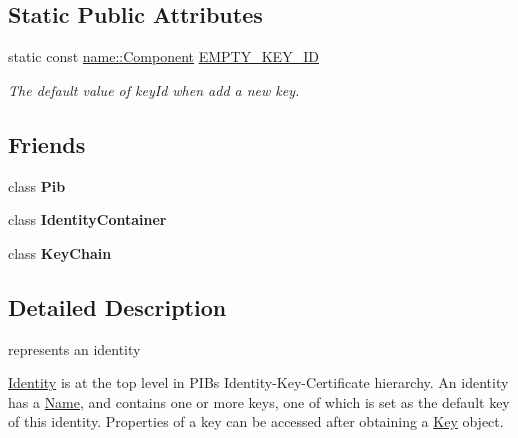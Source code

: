 \subsection*{Static Public Attributes}
\begin{DoxyCompactItemize}
\item 
static const \hyperlink{classndn_1_1name_1_1Component}{name\+::\+Component} \hyperlink{classndn_1_1security_1_1Identity_a4cbc752ea1f032e469cd886d6ba6ed96}{E\+M\+P\+T\+Y\+\_\+\+K\+E\+Y\+\_\+\+ID}
\begin{DoxyCompactList}\small\item\em The default value of key\+Id when add a new key. \end{DoxyCompactList}\end{DoxyCompactItemize}
\subsection*{Friends}
\begin{DoxyCompactItemize}
\item 
class {\bfseries Pib}\hypertarget{classndn_1_1security_1_1Identity_ad5330cedd6d218ab8ffe8a3c603bb2ca}{}\label{classndn_1_1security_1_1Identity_ad5330cedd6d218ab8ffe8a3c603bb2ca}

\item 
class {\bfseries Identity\+Container}\hypertarget{classndn_1_1security_1_1Identity_ae5d8d658f9d92ad82312b7f52b4c5ef1}{}\label{classndn_1_1security_1_1Identity_ae5d8d658f9d92ad82312b7f52b4c5ef1}

\item 
class {\bfseries Key\+Chain}\hypertarget{classndn_1_1security_1_1Identity_a4575cb0348247df0457c276b54b06764}{}\label{classndn_1_1security_1_1Identity_a4575cb0348247df0457c276b54b06764}

\end{DoxyCompactItemize}


\subsection{Detailed Description}
represents an identity 

\hyperlink{classndn_1_1security_1_1Identity}{Identity} is at the top level in P\+IB\textquotesingle{}s Identity-\/\+Key-\/\+Certificate hierarchy. An identity has a \hyperlink{classndn_1_1Name}{Name}, and contains one or more keys, one of which is set as the default key of this identity. Properties of a key can be accessed after obtaining a \hyperlink{classndn_1_1security_1_1Key}{Key} object.


